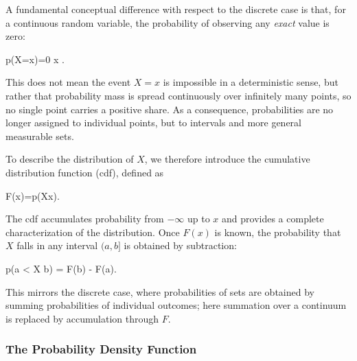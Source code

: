 A fundamental conceptual difference with respect to the discrete case is that, for a continuous random variable, the probability of observing any \emph{exact} value is zero:
\begin{myequation}
p(X=x)=0 \quad {} x \in {}.
\end{myequation}
This does not mean the event $X=x$ is impossible in a deterministic sense, but rather that probability mass is spread continuously over infinitely many points, so no single point carries a positive share. As a consequence, probabilities are no longer assigned to individual points, but to intervals and more general measurable sets.

To describe the distribution of $X$, we therefore introduce the \alert{cumulative distribution function} (cdf), defined as
\begin{myequation}
F(x)=p(X\leq x).
\end{myequation}
The cdf accumulates probability from $-\infty$ up to $x$ and provides a complete characterization of the distribution. Once $F(x)$ is known, the probability that $X$ falls in any interval $(a,b]$ is obtained by subtraction:
\begin{myequation}
p(a < X \leq b) = F(b) - F(a).
\end{myequation}
This mirrors the discrete case, where probabilities of sets are obtained by summing probabilities of individual outcomes; here summation over a continuum is replaced by accumulation through $F$.

\subsubsection*{The Probability Density Function}

